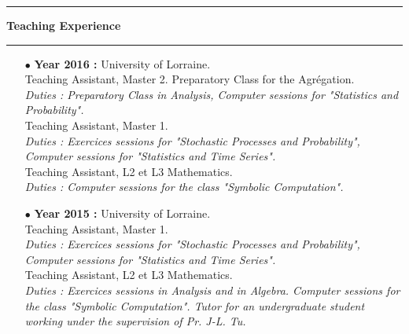 \documentclass[a4paper,11pt]{article}
\newcommand{\titre}[1]{%
	\begin{center}
	\bigskip
	\rule{\textwidth}{1pt}
	\par\vspace{0.1cm}
        \textbf{\large #1}
	\par\rule{\textwidth}{1pt}
	\end{center}
	\bigskip
	}
\begin{document}
\titre{Teaching Experience}

\begin{itemize}
\item[$\bullet$] \textbf{ Year 2016 :} University of Lorraine.\\
					Teaching Assistant, Master 2. Preparatory Class for the Agrégation.\\
					\textit{Duties : Preparatory Class in Analysis, Computer sessions for "Statistics and Probability".}\\
					Teaching Assistant, Master 1.\\
					\textit{Duties : Exercices sessions for "Stochastic Processes and Probability", Computer sessions for "Statistics and Time Series".}\\
					Teaching Assistant, L2 et L3 Mathematics. \\
					\textit{Duties : Computer sessions for the class "Symbolic Computation".}\\   
\item[$\bullet$] \textbf{ Year 2015 :} University of Lorraine.\\
					Teaching Assistant, Master 1.\\
					\textit{Duties : Exercices sessions for "Stochastic Processes and Probability", Computer sessions for "Statistics and Time Series".}\\
					Teaching Assistant, L2 et L3 Mathematics. \\
					\textit{Duties : Exercices sessions in Analysis and in Algebra. Computer sessions for the class "Symbolic Computation". Tutor for an undergraduate student working under the supervision of Pr. J-L. Tu.}\\   
					

\end{itemize}
\end{document}
